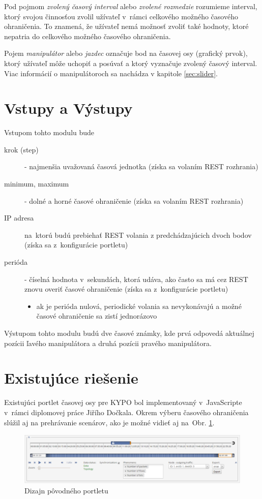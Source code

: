 \documentclass[
  printed, %
  twoside, %
  notable,   %
  nolof,   %
  nolot,   %
]{fithesis3}
\begin{document}
Pod pojmom \textit{zvolený časový interval} alebo \textit{zvolené rozmedzie} ro\-zu\-mie\-me interval, ktorý svojou činnosťou zvolil užívateľ v~rámci celkového možného časového ohraničenia. To znamená, že užívateľ nemá možnosť zvoliť také hodnoty, ktoré nepatria do celkového možného časového ohraničenia.

Pojem \textit{manipulátor} alebo \textit{jazdec} označuje bod na časovej osy (grafický prvok), ktorý užívateľ môže uchopiť a posúvať a ktorý vyznačuje zvolený časový interval. Viac informácií o manipulátoroch sa nachádza v kapitole \ref{sec:slider}.

\section{Vstupy a Výstupy}
Vstupom tohto modulu bude
\begin{description}
\item[krok (step)] - najmenšia uvažovaná časová jednotka (získa sa volaním REST rozhrania)
\item[minimum, maximum] - dolné a horné časové ohraničenie (získa sa volaním REST rozhrania)
\item[IP adresa] na~ktorú budú prebiehať REST volania z predchádzajúcich dvoch bodov (získa sa z~konfigurácie portletu)
\item[perióda] - číselná hodnota v~sekundách, ktorá udáva, ako často sa má cez REST znovu overiť časové ohraničenie (získa sa z~konfigurácie portletu)
\begin{itemize}
\item ak je perióda nulová, periodické volania sa nevykonávajú a možné časové ohraničenie sa zistí jednorázovo
\end{itemize}
\end{description}
Výstupom tohto modulu budú dve časové známky, kde prvá odpovedá aktuálnej pozícii ľavého manipulátora a druhá pozícii pravého manipulátora.

\section{Existujúce riešenie}
Existujúci portlet časovej osy pre KYPO bol implementovaný v~JavaScripte v~rámci diplomovej práce Jiřího Dočkala\cite{dockal2016webovy}. Okrem výberu časového ohraničenia slúžil aj na prehrávanie scenárov, ako je možné vidieť aj na~Obr. \ref{old_portlet}.

\begin{figure}[H]
	\center
	\includegraphics[width=1.0\linewidth]{old_portlet}
	\caption{Dizajn pôvodného portletu\cite{dockal2016webovy}}
	\label{old_portlet}
\end{figure}
\end{document}

